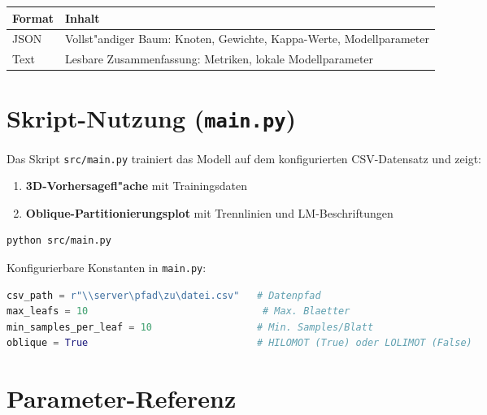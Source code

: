 \documentclass[12pt,a4paper]{article}
\begin{document}
\begin{center}
\begin{tabular}{ll}
  \toprule
  \textbf{Format} & \textbf{Inhalt} \\
  \midrule
  JSON & Vollst"andiger Baum: Knoten, Gewichte, Kappa-Werte, Modellparameter \\
  Text & Lesbare Zusammenfassung: Metriken, lokale Modellparameter \\
  \bottomrule
\end{tabular}
\end{center}

\section{Skript-Nutzung (\texttt{main.py})}

Das Skript \texttt{src/main.py} trainiert das Modell auf dem konfigurierten CSV-Datensatz und zeigt:
\begin{enumerate}
  \item \textbf{3D-Vorhersagefl"ache} mit Trainingsdaten
  \item \textbf{Oblique-Partitionierungsplot} mit Trennlinien und LM-Beschriftungen
\end{enumerate}

\begin{lstlisting}[language=bash]
python src/main.py
\end{lstlisting}

Konfigurierbare Konstanten in \texttt{main.py}:

\begin{lstlisting}[language=python,caption={Konfiguration in main.py}]
csv_path = r"\\server\pfad\zu\datei.csv"   # Datenpfad
max_leafs = 10                              # Max. Blaetter
min_samples_per_leaf = 10                  # Min. Samples/Blatt
oblique = True                             # HILOMOT (True) oder LOLIMOT (False)
\end{lstlisting}

\section{Parameter-Referenz}
\end{document}
